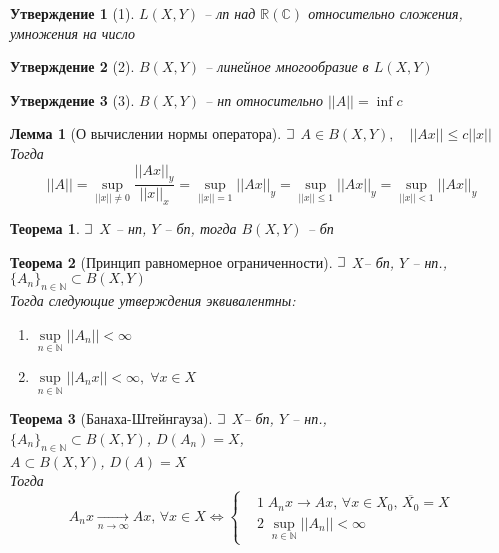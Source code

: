 \documentclass{article}
\theoremstyle{truestyle}
\newtheorem*{theorem}{Теорема}
\newtheorem*{lemma}{Лемма}
\newtheorem*{utv}{Утверждение}
\def\letus{%
	\mathord{\setbox0=\hbox{$\exists$}%
		\hbox{\kern 0.125\wd0%
			\vbox to \ht0{%
				\hrule width 0.75\wd0%
				\vfill%
				\hrule width 0.75\wd0}%
			\vrule height \ht0%
			\kern 0.125\wd0}%
	}%
}
\begin{document}
\begin{utv} [1]
	$L(X, Y)$ -- лп над $\mathbb{R}(\mathbb{C})$ относительно сложения, умножения на число
\end{utv}

\begin{utv} [2]
	$B(X, Y)$ -- линейное многообразие в $L(X, Y)$
\end{utv}

\begin{utv} [3]
	$B(X, Y)$ -- нп относительно $||A||= \inf c$
\end{utv}

\begin{lemma}[О вычислении нормы оператора]
  $\letus$ $A \in B(X, Y), \quad ||Ax|| \le c||x||$\\ 
  Тогда
  $$ ||A|| = \sup_{||x|| \ne 0}\frac{||Ax||_{y}}{||x||_{x}} = \sup_{||x|| = 1}||Ax||_{y} = 
  \sup_{||x|| \le 1}||Ax||_{y} = \sup_{||x|| < 1}||Ax||_{y}$$
\end{lemma}

\begin{theorem}
	$\letus$ $X$ -- нп, $Y$ -- бп, тогда $B(X, Y)$ -- бп
\end{theorem}

\begin{theorem}[Принцип равномерное ограниченности]
  $\letus$ $X$-- бп, $Y$ -- нп., $ \{A_n\}_{n \in \mathbb{N}} \subset B(X,Y)$\\
  Тогда следующие утверждения эквивалентны:
  \begin{minipage}[t]{0.8\linewidth}\begin{enumerate}[itemsep=1mm]
      \item $\sup\limits_{n \in \mathbb{N}} ||A_n|| < \infty$
      \item $\sup\limits_{n \in \mathbb{N}} ||A_n x|| < \infty, \; \forall x \in X$
  \end{enumerate}\end{minipage}
\end{theorem}

\begin{theorem}[Банаха-Штейнгауза]
  $\letus$ $X$-- бп, $Y$ -- нп., \\ $ \{A_n\}_{n \in \mathbb{N}} \subset B(X,Y)$, $D(A_n) = X$, \\ $A\subset B(X,Y)$, $D(A) = X$\\
  Тогда
  $$A_n x \underset{n\to \infty}\longrightarrow Ax, \, \forall x \in X \Longleftrightarrow \left\{
  \begin{aligned}
    & 1\; A_n x \longrightarrow Ax, \, \forall x \in X_0, \,\overline{X_0} = X\\
    & 2\; \sup\limits_{n \in \mathbb{N}} ||A_n|| < \infty
  \end{aligned} \right.$$
\end{theorem}
\end{document}
